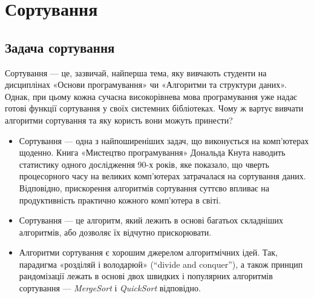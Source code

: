 \documentclass[12pt,a4paper]{report}
\begin{document}
\chapter{Сортування}

\begingroup
\let\clearpage\relax
\tableofcontents
\endgroup



\section{Задача сортування}

Сортування --- це, зазвичай, найперша тема, яку вивчають студенти на дисциплінах «Основи програмування» чи «Алгоритми та структури даних».
Однак, при цьому кожна сучасна високорівнева мова програмування уже надає готові функції сортування у своїх системних бібліотеках.
Чому ж вартує вивчати алгоритми сортування та яку користь вони можуть принести?

\begin{itemize}
    \item Сортування --- одна з найпоширеніших задач, що виконується на комп’ютерах щоденно.
        Книга «Мистецтво програмування» Дональда Кнута наводить статистику одного дослідження 90-х років, яке показало, що чверть процесорного часу на великих комп'ютерах затрачалася на сортування даних.
        Відповідно, прискорення алгоритмів сортування суттєво впливає на продуктивність практично кожного комп’ютера в світі.
    \item Сортування --- це алгоритм, який лежить в основі багатьох складніших алгоритмів, або дозволяє їх відчутно прискорювати.
    \item Алгоритми сортування є хорошим джерелом алгоритмічних ідей.
        Так, парадигма «розділяй і володарюй» (``divide and conquer''), а також принцип рандомізації лежать в основі двох швидких і популярних алгоритмів сортування --- \emph{MergeSort} і \emph{QuickSort} відповідно.
\end{itemize}
\end{document}

